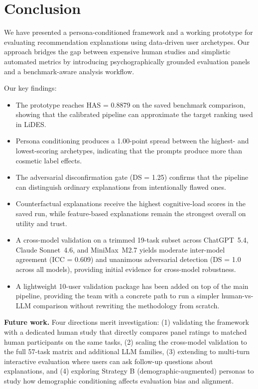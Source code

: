 \documentclass[sigconf,nonacm]{acmart}
\begin{document}
\section{Conclusion}
\label{sec:conclusion}

We have presented a persona-conditioned framework and a working prototype for evaluating recommendation explanations using data-driven user archetypes. Our approach bridges the gap between expensive human studies and simplistic automated metrics by introducing psychographically grounded evaluation panels and a benchmark-aware analysis workflow.

Our key findings:
\begin{itemize}[leftmargin=*]
\item The prototype reaches HAS = 0.8879 on the saved benchmark comparison, showing that the calibrated pipeline can approximate the target ranking used in LiDES.
\item Persona conditioning produces a 1.00-point spread between the highest- and lowest-scoring archetypes, indicating that the prompts produce more than cosmetic label effects.
\item The adversarial disconfirmation gate (DS = 1.25) confirms that the pipeline can distinguish ordinary explanations from intentionally flawed ones.
\item Counterfactual explanations receive the highest cognitive-load scores in the saved run, while feature-based explanations remain the strongest overall on utility and trust.
\item A cross-model validation on a trimmed 19-task subset across ChatGPT~5.4, Claude Sonnet~4.6, and MiniMax~M2.7 yields moderate inter-model agreement (ICC = 0.609) and unanimous adversarial detection (DS = 1.0 across all models), providing initial evidence for cross-model robustness.
\item A lightweight 10-user validation package has been added on top of the main pipeline, providing the team with a concrete path to run a simpler human-vs-LLM comparison without rewriting the methodology from scratch.
\end{itemize}

\textbf{Future work.} Four directions merit investigation: (1) validating the framework with a dedicated human study that directly compares panel ratings to matched human participants on the same tasks, (2) scaling the cross-model validation to the full 57-task matrix and additional LLM families, (3) extending to multi-turn interactive evaluation where users can ask follow-up questions about explanations, and (4) exploring Strategy B (demographic-augmented) personas to study how demographic conditioning affects evaluation bias and alignment.
\end{document}
